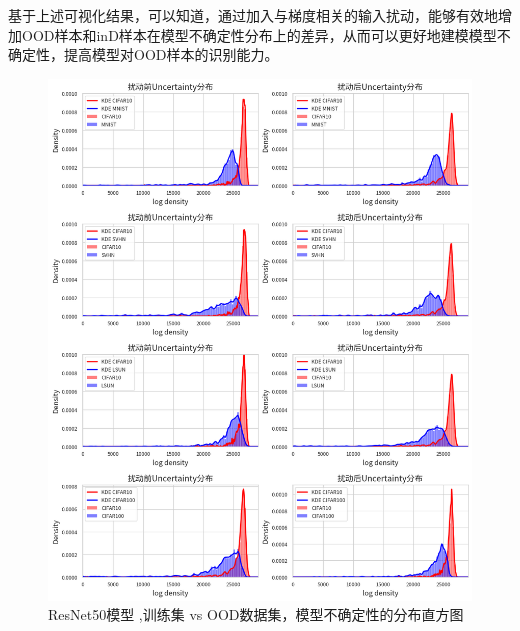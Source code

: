 基于上述可视化结果，可以知道，通过加入与梯度相关的输入扰动，能够有效地增加OOD样本和inD样本在模型不确定性分布上的差异，从而可以更好地建模模型不确定性，提高模型对OOD样本的识别能力。



\begin{figure}[htbp]
    \vspace{-1pt} %
    \centering
    \includegraphics[width=\linewidth]{assets/combined_vertical_image.png}
    \vspace{-1pt} %
    \caption{ResNet50模型 ,训练集 vs OOD数据集，模型不确定性的分布直方图}
    \label{tag:uncertainty 1}
\end{figure}


